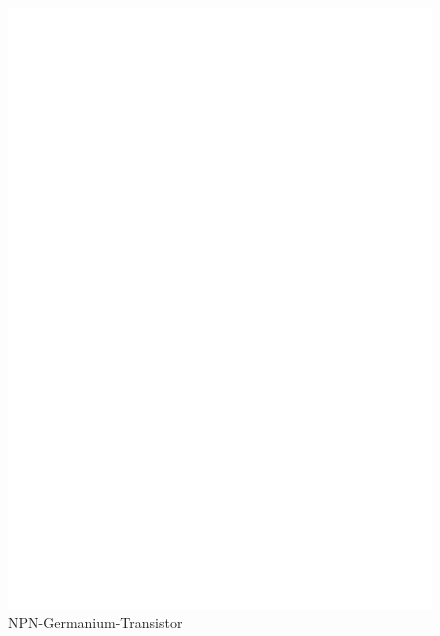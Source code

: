 \begin{figure}[H]
\centering
\includegraphics[]{../FIG/BJT_AD161.eps}
\caption{NPN-Germanium-Transistor}
\label{fig:BJT-NPN-Ge}
\end{figure}


